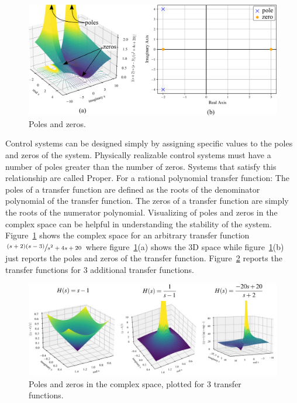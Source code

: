\documentclass[12pt,letter]{article}
\begin{document}
			\begin{figure}[H]
				\centering
				\includegraphics[width=5.0in]{../figures/transfer_function_poles_and_zeros_and_3D_space.png}
				\caption{Poles and zeros.}
				\label{fig:transfer_function_poles_and_zeros_and_3D_space}
			\end{figure}

	Control systems can be designed simply by assigning specific values to the poles and zeros of the system. Physically realizable control systems must have a number of poles greater than the number of zeros. Systems that satisfy this relationship are called Proper. For a rational polynomial transfer function: The poles of a transfer function are defined as the roots of the denominator polynomial of the transfer function.  The zeros of a transfer function are simply the roots of the numerator polynomial. Visualizing of poles and zeros in the complex space can be helpful in understanding the stability of the system. Figure~\ref{fig:transfer_function_poles_and_zeros_and_3D_space} shows the complex space for an arbitrary transfer function $\sfrac{(s+2)(s-3)}{s^2+4s+20}$ where figure~\ref{fig:transfer_function_poles_and_zeros_and_3D_space}(a) shows the 3D space while figure~\ref{fig:transfer_function_poles_and_zeros_and_3D_space}(b) just reports the poles and zeros of the transfer function.  Figure~\ref{fig:transfer_function_3D_space_3_examples} reports the transfer functions for 3 additional transfer functions.  

			\begin{figure}[H]
				\centering
				\includegraphics[width=6.5in]{../figures/transfer_function_3D_space_3_examples.png}
				\caption{Poles and zeros in the complex space, plotted for 3 transfer functions.}
				\label{fig:transfer_function_3D_space_3_examples}
			\end{figure}
\end{document}
